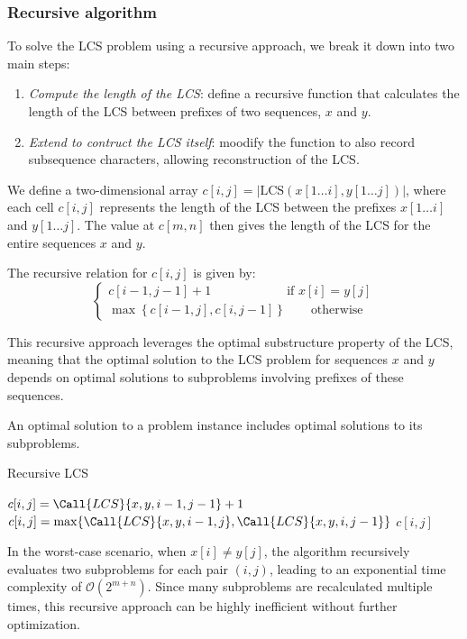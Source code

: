 \subsubsection{Recursive algorithm}
To solve the LCS problem using a recursive approach, we break it down into two main steps:
\begin{enumerate}
    \item \textit{Compute the length of the LCS}: define a recursive function that calculates the length of the LCS between prefixes of two sequences, $x$ and $y$. 
    \item \textit{Extend to contruct the LCS itself}: moodify the function to also record subsequence characters, allowing reconstruction of the LCS.
\end{enumerate}
We define a two-dimensional array $c[i, j] = \left\lvert \text{LCS}(x[1 \dots i], y[1 \dots j])\right\rvert $, where each cell $c[i, j]$ represents the length of the LCS between the prefixes $x[1 \dots i]$ and $y[1 \dots j]$.
The value at $c[m,n]$ then gives the length of the LCS for the entire sequences $x$ and $y$. 
\begin{theorem}
    The recursive relation for $c[i,j]$ is given by:
    \[\begin{cases}
        c[i-1, j-1] + 1 \qquad\qquad\qquad \text{if }x[i] = y[j] \\
        \max\left\{c[i-1, j], c[i, j-1]\right\} \qquad \text{otherwise}
    \end{cases}\]
\end{theorem}
This recursive approach leverages the optimal substructure property of the LCS, meaning that the optimal solution to the LCS problem for sequences $x$ and $y$ depends on optimal solutions to subproblems involving prefixes of these sequences.
\begin{definition}
    An optimal solution to a problem instance includes optimal solutions to its subproblems.
\end{definition}
\begin{algorithm}[H]
    \caption{Recursive LCS}
    \begin{algorithmic}
                \State $c[i,j]=\Call{LCS}{x, y, i-1, j-1} +1$
            \Else 
                \State $c[i,j]=\max\{\Call{LCS}{x, y, i-1, j},\Call{LCS}{x, y, i, j-1}\}$
            \EndIf 
            \State \Return $c[i,j]$
        \EndFunction
    \end{algorithmic}
\end{algorithm}  
In the worst-case scenario, when $x[i] \neq y[j]$, the algorithm recursively evaluates two subproblems for each pair $(i,j)$, leading to an exponential time complexity of $\mathcal{O}(2^{m+n})$.
Since many subproblems are recalculated multiple times, this recursive approach can be highly inefficient without further optimization.

